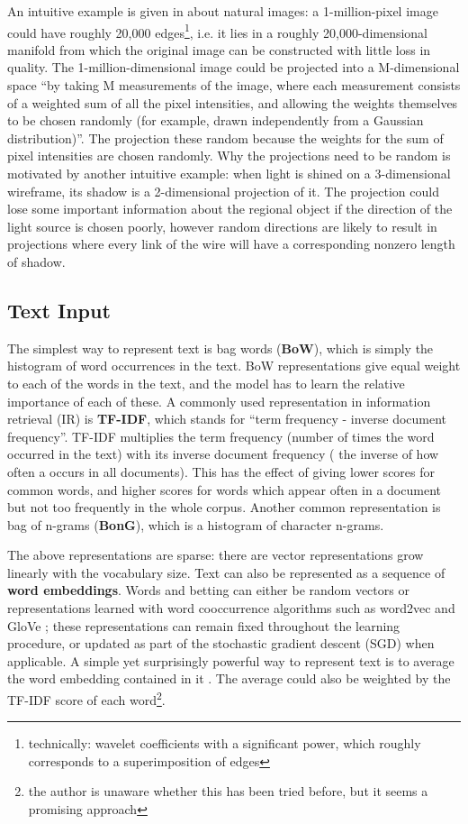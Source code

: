 An intuitive example is given in \cite{compressive_sensing3} about natural images: a 1-million-pixel image could have roughly 20,000 edges\footnote{technically: wavelet coefficients with a significant power, which roughly corresponds to a superimposition of edges}, i.e. it lies in a roughly 20,000-dimensional manifold from which the original image can be constructed with little loss in quality.
The 1-million-dimensional image could be projected into a M-dimensional space ``by taking M measurements of the image, where each measurement consists of a weighted sum of all the pixel intensities, and allowing the weights themselves to be chosen randomly (for example, drawn independently from a Gaussian distribution)''\cite{compressive_sensing3}.
The projection these random because the weights for the sum of pixel intensities are chosen randomly.
Why the projections need to be random is motivated by another intuitive example:  when light is shined on a 3-dimensional wireframe, its shadow is a 2-dimensional projection of it.
The projection could lose some important information about the regional object if the direction of the light source is chosen poorly,  however random directions are likely to result in projections where every link of the wire will have a corresponding nonzero length of shadow.

\subsection{Text Input}

The simplest way to represent  text is bag words (\textbf{BoW}),  which  is simply the histogram of word occurrences  in the text.
BoW  representations give equal weight to each of the words in the text, and the model has to learn the relative importance of each of these.
A commonly used representation in information retrieval (IR) is \textbf{TF-IDF},  which stands for ``term frequency -  inverse document frequency''.
TF-IDF  multiplies the term frequency (number of times the word occurred in the text) with its inverse document frequency ( the inverse of how often a occurs in all documents).
This has the effect of giving lower scores for common words, and higher scores for words which appear often in a document but not too frequently in the whole corpus.
Another common representation is bag of n-grams (\textbf{BonG}), which  is a histogram of character n-grams.

The above representations are sparse: there are vector representations grow linearly with the vocabulary size.
Text can also be  represented as a sequence of \textbf{word embeddings}.
Words and betting can either be random vectors or representations  learned with word cooccurrence algorithms such as word2vec \cite{} and GloVe \cite{};  these representations can remain fixed throughout the learning procedure, or updated as part of the stochastic gradient descent (SGD) when applicable.
A simple yet surprisingly powerful way to represent text is to average the word embedding contained in it \cite{}.
The  average could also be weighted by the TF-IDF score of each word\footnote{the author is unaware whether this has been tried before, but it seems a promising approach}.


